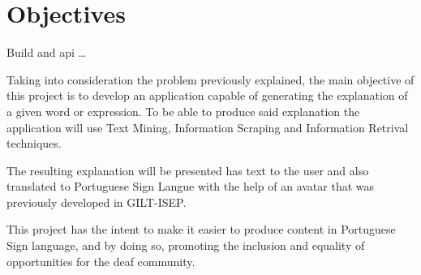 \section{Objectives}

Build and api \dots

Taking into consideration the problem previously explained, the main objective of this project is to develop an application capable of generating the explanation of a given word or expression.
To be able to produce said explanation the application will use Text Mining, Information Scraping and Information Retrival techniques.

The resulting explanation will be presented has text to the user and also translated to Portuguese Sign Langue with the help of an avatar that was previously developed in GILT-ISEP.

This project has the intent to make it easier to produce content in Portuguese Sign language, and by doing so, promoting the inclusion and equality of opportunities for the deaf community. 


